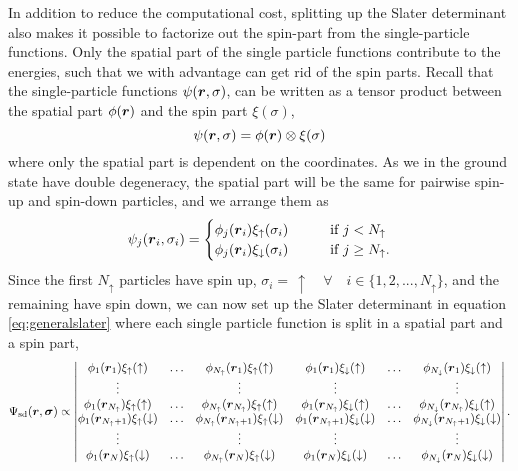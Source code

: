 In addition to reduce the computational cost, splitting up the Slater determinant also makes it possible to factorize out the spin-part from the single-particle functions. Only the spatial part of the single particle functions contribute to the energies, such that we with advantage can get rid of the spin parts. Recall that the single-particle functions $\psi(\boldsymbol{{r}},\sigma)$, can be written as a tensor product between the spatial part $\phi(\boldsymbol{{r}})$ and the spin part $\xi(\sigma)$, 
\begin{equation}
\psi(\boldsymbol{{r}},\sigma)=\phi(\boldsymbol{{r}})\otimes\xi(\sigma) 
\end{equation}
where only the spatial part is dependent on the coordinates. As we in the ground state have double degeneracy, the spatial part will be the same for pairwise spin-up and spin-down particles, and we arrange them as
\begin{equation}
\psi_j(\boldsymbol{{r}}_i,\sigma_i)=
\begin{cases}
\phi_j(\boldsymbol{{r}}_i)\xi_{\uparrow}(\sigma_i)\quad\quad&\text{if } j<N_{\uparrow}\\
\phi_j(\boldsymbol{{r}}_i)\xi_{\downarrow}(\sigma_i)\quad\quad&\text{if } j\geq N_{\uparrow}.
\end{cases}
\end{equation}
Since the first $N_{\uparrow}$ particles have spin up, $\sigma_i=\,\uparrow\quad\forall\quad i\in\{1,2,...,N_{\uparrow}\}$, and the remaining have spin down, we can now set up the Slater determinant in equation \eqref{eq:generalslater} where each single particle function is split in a spatial part and a spin part,
\begin{equation*}
\Psi_{\text{sd}}(\boldsymbol{r},\boldsymbol{{\sigma}})\propto
\begin{vmatrix}
\phi_1(\boldsymbol{r}_1)\xi_{\uparrow}(\uparrow) & \hdots & \phi_{N_{\uparrow}}(\boldsymbol{r}_1)\xi_{\uparrow}(\uparrow) & \phi_{1}(\boldsymbol{r}_1)\xi_{\downarrow}(\uparrow) & \hdots & \phi_{N_{\downarrow}}(\boldsymbol{r}_1)\xi_{\downarrow}(\uparrow)\\
\vdots & & \vdots & \vdots & & \vdots \\
\phi_1(\boldsymbol{r}_{N_{\uparrow}})\xi_{\uparrow}(\uparrow) & \hdots & \phi_{N_{\uparrow}}(\boldsymbol{r}_{N_{\uparrow}})\xi_{\uparrow}(\uparrow) & \phi_{1}(\boldsymbol{r}_{N_{\uparrow}})\xi_{\downarrow}(\uparrow) & \hdots & \phi_{N_{\downarrow}}(\boldsymbol{r}_{N_{\uparrow}})\xi_{\downarrow}(\uparrow)\\
\phi_1(\boldsymbol{r}_{N_{\uparrow}+1})\xi_{\uparrow}(\downarrow) & \hdots & \phi_{N_{\uparrow}}(\boldsymbol{r}_{N_{\uparrow}+1})\xi_{\uparrow}(\downarrow) & \phi_{1}(\boldsymbol{r}_{N_{\uparrow}+1})\xi_{\downarrow}(\downarrow) & \hdots & \phi_{N_{\downarrow}}(\boldsymbol{r}_{N_{\uparrow}+1})\xi_{\downarrow}(\downarrow)\\
\vdots & & \vdots & \vdots & & \vdots \\
\phi_1(\boldsymbol{r}_N)\xi_{\uparrow}(\downarrow) & \hdots & \phi_{N_{\uparrow}}(\boldsymbol{r}_N)\xi_{\uparrow}(\downarrow) & \phi_{1}(\boldsymbol{r}_N)\xi_{\downarrow}(\downarrow) & \hdots & \phi_{N_{\downarrow}}(\boldsymbol{r}_N)\xi_{\downarrow}(\downarrow)\\
\end{vmatrix}.
\end{equation*}
